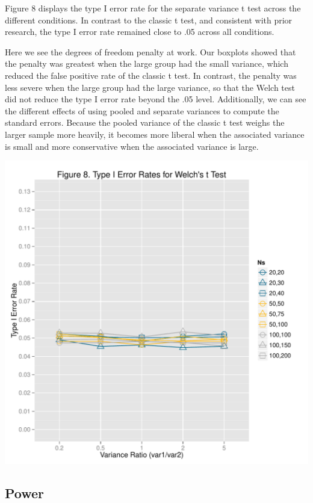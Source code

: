 \documentclass[man,a4paper,noextraspace]{apa6}\usepackage[]{graphicx}\usepackage[]{color}
\makeatletter
\def\maxwidth{ %
  \ifdim\Gin@nat@width>\linewidth
    \linewidth
  \else
    \Gin@nat@width
  \fi
}
\newenvironment{knitrout}{}{} %
\makeatother
\begin{document}
    Figure 8 displays the type I error rate for the separate variance t test across the different conditions. In contrast to the classic t test, and consistent with prior research, the type I error rate remained close to .05 across all conditions. 
    
    Here we see the degrees of freedom penalty at work. Our boxplots showed that the penalty was greatest when the large group had the small variance, which reduced the false positive rate of the classic t test. In contrast, the penalty was less severe when the large group had the large variance, so that the Welch test did not reduce the type I error rate beyond the .05 level. Additionally, we can see the different effects of using pooled and separate variances to compute the standard errors. Because the pooled variance of the classic t test weighs the larger sample more heavily, it becomes more liberal when the associated variance is small and more conservative when the associated variance is large. 

\begin{knitrout}
\color{fgcolor}
\includegraphics[width=\maxwidth]{figure/type1_Welch_plot} 

\end{knitrout}

\subsection{Power}
\end{document}
